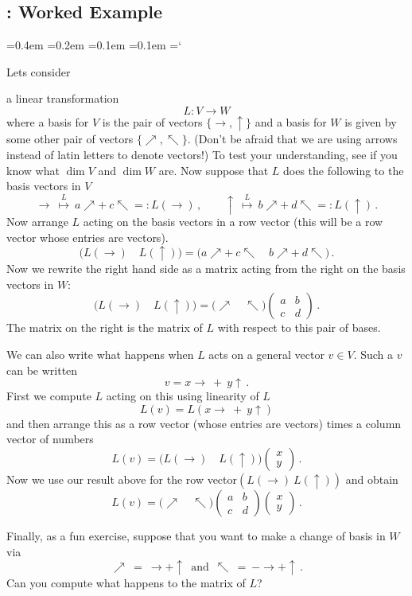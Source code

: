 
\subsection{\eigenTitle: Worked Example}

{\ttfamily
{}\font=0.4em
\font=0.2em
\font=0.1em
\font=0.1em
\hyphenchar\font=`\-


\hypertarget{scripts_eigenvalseigenvects_matrix}{Lets consider }
a linear transformation 
\[L:V\longrightarrow W\]
where a basis for $V$ is the pair of vectors $\{\to,\uparrow\}$
and a basis for $W$ is given by some other pair of vectors $\{\nearrow,\nwarrow\}$. (Don't be afraid that we are using arrows instead of latin letters to denote vectors!) To test your understanding, see if you know what $\dim V$ and $\dim W$ are. Now suppose that $L$ does the 
following to the basis vectors in $V$
\[
\to \ \stackrel{L}\mapsto\  a\nearrow + \ c\nwarrow =: L(\to)\, ,\qquad \uparrow \ \stackrel{L}\mapsto \ 
b\nearrow +\  d\nwarrow=: L(\uparrow)\, .
\]
Now arrange $L$ acting on the basis vectors in a row vector (this will be a row vector whose entries are vectors).
\[
\big(L(\to)\quad L(\uparrow)\big)
=
\big(a\nearrow + \ c\nwarrow\quad b\nearrow + \ d\nwarrow\big)\, .
\]
Now we rewrite the right hand side as a matrix acting from the right on the basis vectors in $W$:
\[
\big(L(\to)\quad L(\uparrow)\big)
=
\big(\nearrow\quad \nwarrow\big)
\begin{pmatrix}
a&b\\c&d
\end{pmatrix}\, .
\]
The matrix on the right is the matrix of $L$ with respect to this pair of bases.

We can also write what happens when $L$ acts on a general vector $v\in V$. Such a $v$ can be written
\[
v=x \to \ + \ y \uparrow\, .
\]
First we compute $L$ acting on this using linearity of $L$
\[
L(v) = L(x \to \ + \ y \uparrow)
\]
and then arrange this as a row vector (whose entries are vectors) times a column vector of numbers
\[
L(v) = \big(L(\to)\quad  L(\uparrow)\big)\begin{pmatrix}x\\y\end{pmatrix}\, .
\] 
Now we use our result above for the row vector$(L(\to)\ L(\uparrow))$
and obtain
\[
L(v) = \big(\nearrow\quad \nwarrow\big)
\begin{pmatrix}
a&b\\c&d
\end{pmatrix}
\begin{pmatrix}x\\y\end{pmatrix}\, .
\]

Finally, as a fun exercise, suppose that you want to make a change of basis in $W$ via
\[
\nearrow \ = \ \to + \uparrow\, \mbox{ and } \, \nwarrow\ =\  -\to + \uparrow\, .
\]
Can you compute what happens to the matrix of $L$?

} %

\newpage

